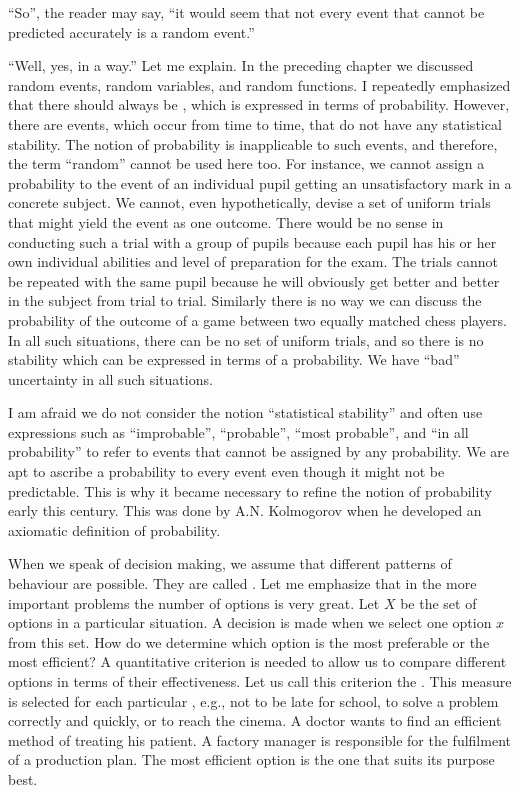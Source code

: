 ``So'', the reader may say, ``it would seem that not every event that
cannot be predicted accurately is a random event.''

``Well, yes, in a way.'' Let me explain. In the preceding chapter we
discussed random events, random variables, and random functions.  I
repeatedly emphasized that there should always be , which is expressed in terms of probability. However,
there are events, which occur from time to time, that do not have any
statistical stability. The notion of probability is inapplicable to
such events, and therefore, the term ``random'' cannot be used here
too. For instance, we cannot assign a probability to the event of an
individual pupil getting an unsatisfactory mark in a concrete
subject. We cannot, even hypothetically, devise a set of uniform
trials that might yield the event as one outcome. There would be no
sense in conducting such a trial with a group of pupils because each
pupil has his or her own individual abilities and level of preparation
for the exam. The trials cannot be repeated with the same pupil
because he will obviously get better and better in the subject from
trial to trial. Similarly there is no way we can discuss the
probability of the outcome of a game between two equally matched chess
players. In all such situations, there can be no set of uniform
trials, and so there is no stability which can be expressed in terms
of a probability. We have ``bad'' uncertainty in all such situations.


I am afraid we do not consider the notion ``statistical stability'' and
often use expressions such as ``improbable'', ``probable'', ``most
probable'', and ``in all probability'' to refer to events that cannot be
assigned by any probability. We are apt to ascribe a probability to every
event even though it might not be predictable. This is why it became
necessary to refine the notion of probability early this century. This was
done by A.N. Kolmogorov when he developed an axiomatic definition
of probability.

 When we speak of
decision making, we assume that different patterns of behaviour are
possible.  They are called . Let me emphasize that in
the more important problems the number of options is very great. Let
$X$ be the set of options in a particular situation. A decision is
made when we select one option $x$ from this set. How do we determine
which option is the most preferable or the most efficient? A
quantitative criterion is needed to allow us to compare different
options in terms of their effectiveness. Let us call this criterion
the . This measure is selected for each
particular , e.g., not to be late for school, to solve a
problem correctly and quickly, or to reach the cinema. A doctor wants
to find an efficient method of treating his patient. A factory manager
is responsible for the fulfilment of a production plan. The most
efficient option is the one that suits its purpose best.


